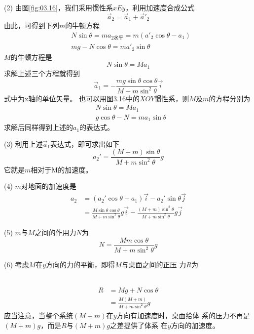 (2) 由图\ref{fig:03.16}，我们采用惯性系$ xEy $，利用加速度合成公式
\begin{equation*}
    \vec{a} _ { 2 } = \vec{a} _ { 1 } + \vec{a}' _ 2
\end{equation*}
由此，可得到下列$ m $的牛顿方程
\begin{align*}
    &N \sin \theta = m a _ { 2\text{水平} }  = m ( a '_2 \cos \theta - a _ { 1 } ) \\
    &m g - N \cos \theta = m a' _ { 2 } \sin \theta
\end{align*}
$ M $的牛顿方程是
\begin{equation*}
    N \sin \theta = M a _ { 1 }
\end{equation*}
求解上述三个方程就得到
\begin{equation*}
    \vec{a} _ { 1 } = - \frac { m g \sin \theta \cos \theta} { M + m \sin ^ { 2 } \theta } \vec{i}
\end{equation*}式中为x轴的单位矢量。
也可以用图3.16中的$ XOY $惯性系，则$ M $及$ m $的方程分别为
\begin{align*}
    &N \sin \theta = M a _ { 1 } \\
    &g \cos \theta - N = m a _ { 1 } \sin \theta
\end{align*}
求解后同样得到上述的$ a_1 $的表达式。

(3) 利用上述$\vec{a}_1$表达式，即可求出如下
\begin{equation*}
    a _ 2 ' = \frac { ( M + m ) \sin \theta } { M + m \sin ^ { 2 } \theta } g
\end{equation*}
它就是$ m $相对于M的加速度。

(4) $ m $对地面的加速度是
\begin{align*}
    a _ { 2 } &= ( a _ { 2 }' \cos \theta - a _ { 1 } ) \vec{i} - a _ 2 ' \sin \theta \vec{j} \\
    &= \frac { M \sin \theta \cos \theta } { M + m \sin ^ { 2 } \theta } g \vec{i} - \frac { ( M + m ) \sin ^ { 2 } \theta } { M + m \sin ^ { 2 } \theta } g \vec{j}
\end{align*}

(5) $ m $与$ M $之间的作用力$ N $为
\begin{equation*}
    N = \frac { M  m \cos \theta } { M + m \sin ^ { 2 } \theta } g
\end{equation*}

(6) 考虑$ M $在$ y $方向的力的平衡，即得$ M $与桌面之间的正压
力$ R $为

~\vspace{-1.56em}
\begin{align*}
    R &= M g + N \cos \theta \\
    &= \frac { M ( M + m ) } { M + m \sin ^ { 2 } \theta } g
\end{align*}
应当注意，当整个系统$  ( M + m )  $在$ y $方向有加速度时，桌面给体
系的压力不再是$  ( M + m ) g  $，而是$ R $与$  ( M + m ) g  $之差提供了体系
在$ y $方向的加速度。